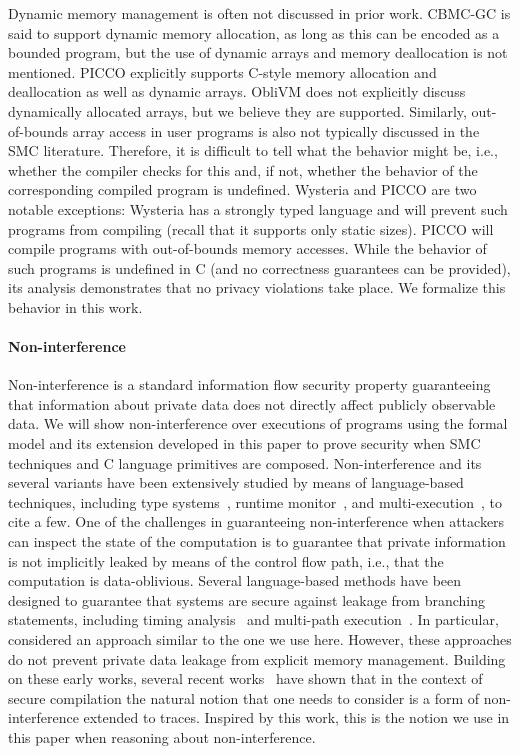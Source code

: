 Dynamic memory management is often not discussed in prior work. CBMC-GC is said to support dynamic memory allocation, as long as this can be encoded as a bounded program, but the use of dynamic arrays and memory deallocation is not mentioned. PICCO explicitly supports C-style memory allocation and deallocation as well as dynamic arrays. ObliVM does not explicitly discuss dynamically allocated arrays, but we believe they are supported.
Similarly, out-of-bounds array access in user programs is also not typically discussed in the SMC literature. Therefore, it is difficult to tell what the behavior might be, i.e., whether the compiler checks for this and, if not, whether the behavior of the corresponding compiled program is undefined. Wysteria and PICCO are two notable exceptions: Wysteria has a strongly typed language and will prevent such programs from compiling (recall that it supports only static sizes). PICCO will compile programs with out-of-bounds memory accesses. While the behavior of such programs is undefined in C (and no correctness guarantees can be provided), its analysis demonstrates that no privacy violations take place. We formalize this behavior in this work.

\paragraph*{Non-interference}
Non-interference is a standard information flow security property guaranteeing that information about private data does not directly affect publicly observable data. We will show non-interference over executions of programs using the formal
model and its extension developed in this paper to prove security when SMC techniques and C language primitives are composed. Non-interference and its several variants have been extensively studied by means of language-based techniques, including type systems~\cite{VolpanoS97,AbadiBHR99}, runtime monitor~\cite{AustinF09,SabelfeldR09}, and multi-execution~\cite{DevrieseP10}, to cite a few. One of the challenges in guaranteeing non-interference when attackers can inspect the state of the computation is to guarantee that private information is not implicitly leaked by means of the control flow path, i.e., that the computation is data-oblivious. Several language-based methods have been designed to guarantee that systems are secure against leakage from branching statements, including timing analysis~\cite{Ford12} and multi-path execution~\cite{PlanulM13,Mitchell0SZ12,LaudP16}.
In particular, \cite{Mitchell0SZ12} considered an approach similar to the one we use here. However, these approaches do not prevent private data leakage from explicit memory management. Building on these early works,  several recent works~\cite{PatrignaniG17,AbateBCD0HPTT20} have shown that in the context of secure compilation the natural notion that one needs to consider is a form of non-interference extended to traces. Inspired by this work, this is the notion we use in this paper when reasoning about non-interference. 




